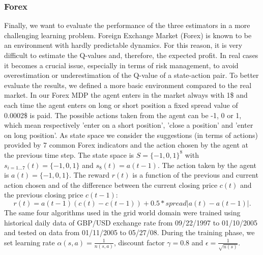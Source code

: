 \subsubsection{Forex}
Finally, we want to evaluate the performance of the three estimators in a more challenging learning problem.
Foreign Exchange Market (Forex) is known to be an environment with hardly predictable dynamics. For this reason, it is very difficult to estimate the Q-values and, therefore, the expected profit. In real cases it becomes a crucial issue, especially in terms of risk management, to avoid overestimation or underestimation of the Q-value of a state-action pair.
To better evaluate the results, we defined a more basic environment compared to the real market. 
In our Forex MDP the agent enters in the market always with 1\$ and each time the agent enters on long or short position a fixed spread value of 0.0002\$ is paid.
The possible actions taken from the agent can be -1, 0 or 1, which mean respectively 'enter on a short position', 'close a position' and 'enter on long position'.
As state space we consider the suggestions (in terms of actions) provided by 7 common Forex indicators and the action chosen by the agent at the previous time step.
The state space is $S = \lbrace -1, 0, 1 \rbrace ^8$ with $s_{i = 1...7}(t) = \lbrace -1, 0, 1 \rbrace$ and $s_8(t) = a(t - 1)$.
The action taken by the agent is $a(t) = \lbrace -1, 0, 1 \rbrace$.
The reward $r(t)$ is a function of the previous and current action chosen and of the difference between the current closing price $c(t)$ and the previous closing price $c(t - 1)$:
$$r(t) = a(t - 1)(c(t) - c(t - 1)) + 0.5 * spread |a(t) - a(t - 1)|.$$
The same four algorithms used in the grid world domain were trained using historical daily data of GBP/USD exchange rate from 09/22/1997 to 01/10/2005 and tested on data from 01/11/2005 to 05/27/08. 
During the training phase, we set learning rate $\alpha(s,a)=\frac{1}{n(s, a)}$, discount factor $\gamma=0.8$ and $\epsilon=\frac{1}{\sqrt{n(s)}}$.


